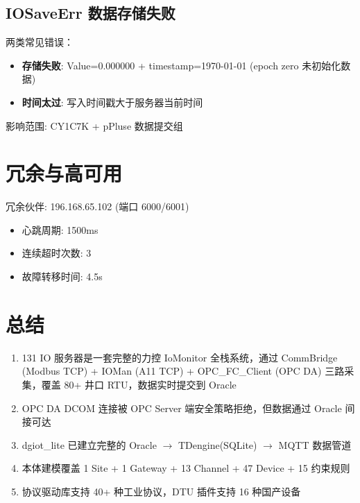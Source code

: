 \documentclass[12pt,a4paper]{ctexart}
\begin{document}
\subsection{IOSaveErr 数据存储失败}

两类常见错误：
\begin{itemize}[leftmargin=*]
  \item \textbf{存储失败}: Value=0.000000 + timestamp=1970-01-01 (epoch zero 未初始化数据)
  \item \textbf{时间太过}: 写入时间戳大于服务器当前时间
\end{itemize}
影响范围: CY1C7K + pPluse 数据提交组

\section{冗余与高可用}

冗余伙伴: 196.168.65.102 (端口 6000/6001)
\begin{itemize}[leftmargin=*]
  \item 心跳周期: 1500ms
  \item 连续超时次数: 3
  \item 故障转移时间: 4.5s
\end{itemize}

\section{总结}

\begin{enumerate}[leftmargin=*]
  \item 131 IO 服务器是一套完整的力控 IoMonitor 全栈系统，通过 CommBridge (Modbus TCP) + IOMan (A11 TCP) + OPC\_FC\_Client (OPC DA) 三路采集，覆盖 80+ 井口 RTU，数据实时提交到 Oracle
  \item OPC DA DCOM 连接被 OPC Server 端安全策略拒绝，但数据通过 Oracle 间接可达
  \item dgiot\_lite 已建立完整的 Oracle $\rightarrow$ TDengine(SQLite) $\rightarrow$ MQTT 数据管道
  \item 本体建模覆盖 1 Site + 1 Gateway + 13 Channel + 47 Device + 15 约束规则
  \item 协议驱动库支持 40+ 种工业协议，DTU 插件支持 16 种国产设备
\end{enumerate}
\end{document}
